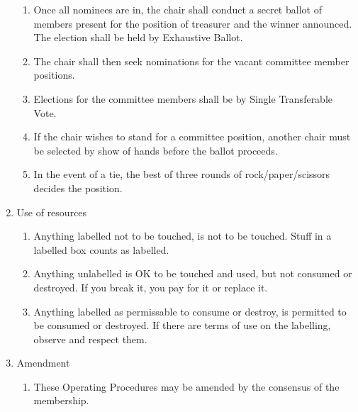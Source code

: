 \documentclass{article}
\begin{document}
\begin{enumerate}
\begin{enumerate}
  \item Once all nominees are in, the chair shall conduct a secret
    ballot of members present for the position of treasurer and the
    winner announced. The election shall be held by Exhaustive Ballot.
  \item The chair shall then seek nominations for the vacant committee
    member positions.
  \item Elections for the committee members shall be by Single
    Transferable Vote.
  \item If the chair wishes to stand for a committee position, another
    chair must be selected by show of hands before the ballot proceeds.
  \item In the event of a tie, the best of three rounds of
    rock/paper/scissors decides the position.
  \end{enumerate}
\item Use of resources
  \begin{enumerate}
  \item Anything labelled not to be touched, is not to be
    touched. Stuff in a labelled box counts as labelled.
  \item Anything unlabelled is OK to be touched and used, but not
    consumed or destroyed. If you break it, you pay for it or replace
    it.
  \item Anything labelled as permissable to consume or destroy, is
    permitted to be consumed or destroyed. If there are terms of use
    on the labelling, observe and respect them.
  \end{enumerate}
\item Amendment
  \begin{enumerate}
  \item These Operating Procedures may be amended by the consensus of
    the membership.
  \end{enumerate} %
\end{enumerate}
\end{document}

